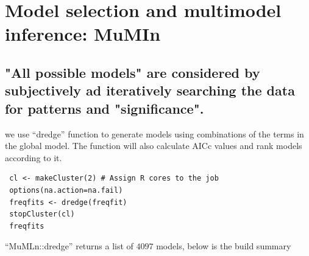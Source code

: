 \documentclass{DissertateUSU}
\begin{document}
\section{Model selection and multimodel inference: MuMIn}
\label{sec:Model selection and multimodel inference: MuMIn}

\singlespace

\subsection{"All possible models" are considered by subjectively ad iteratively searching the data for patterns and "significance".}
\label{ssec:Data_mining}

we use ``dredge'' function to generate models using combinations of the
terms in the global model. The function will also calculate AICc values
and rank models according to it.

\small

\begin{verbatim}
 cl <- makeCluster(2) # Assign R cores to the job
 options(na.action=na.fail)
 freqfits <- dredge(freqfit)
 stopCluster(cl)
 freqfits
\end{verbatim}

\normalsize

``MuMLn::dredge'' returns a list of \(4097\) models, below is the build
summary
\end{document}
